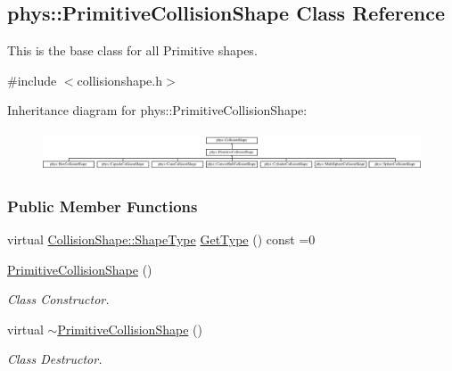 \hypertarget{classphys_1_1PrimitiveCollisionShape}{
\subsection{phys::PrimitiveCollisionShape Class Reference}
\label{classphys_1_1PrimitiveCollisionShape}
}


This is the base class for all Primitive shapes.  




{\ttfamily \#include $<$collisionshape.h$>$}

Inheritance diagram for phys::PrimitiveCollisionShape:\begin{figure}[H]
\begin{center}
\leavevmode
\includegraphics[height=1.170732cm]{classphys_1_1PrimitiveCollisionShape}
\end{center}
\end{figure}
\subsubsection*{Public Member Functions}
\begin{DoxyCompactItemize}
\item 
virtual \hyperlink{classphys_1_1CollisionShape_af3ba4fd8af5b9557f912d2f5ff35a588}{CollisionShape::ShapeType} \hyperlink{classphys_1_1PrimitiveCollisionShape_a16a167ec75ac95aa101b6a9b116e837d}{GetType} () const =0
\item 
\hypertarget{classphys_1_1PrimitiveCollisionShape_a2d74f734744a1ab92b0705cddcd9c7dc}{
\hyperlink{classphys_1_1PrimitiveCollisionShape_a2d74f734744a1ab92b0705cddcd9c7dc}{PrimitiveCollisionShape} ()}
\label{classphys_1_1PrimitiveCollisionShape_a2d74f734744a1ab92b0705cddcd9c7dc}

\begin{DoxyCompactList}\small\item\em Class Constructor. \item\end{DoxyCompactList}\item 
\hypertarget{classphys_1_1PrimitiveCollisionShape_ad0ca2e478e5ed0cf90f9ebc95adf87b4}{
virtual \hyperlink{classphys_1_1PrimitiveCollisionShape_ad0ca2e478e5ed0cf90f9ebc95adf87b4}{$\sim$PrimitiveCollisionShape} ()}
\label{classphys_1_1PrimitiveCollisionShape_ad0ca2e478e5ed0cf90f9ebc95adf87b4}

\begin{DoxyCompactList}\small\item\em Class Destructor. \item\end{DoxyCompactList}\end{DoxyCompactItemize}
